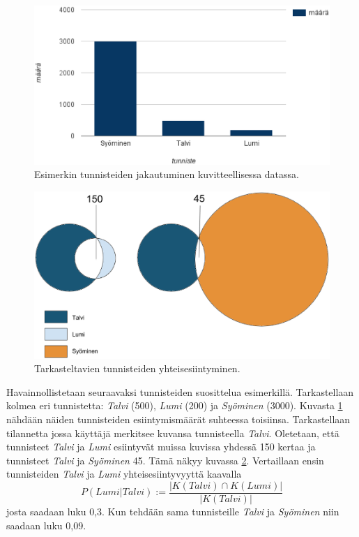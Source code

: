 \documentclass[12pt,finnish]{tktltiki2}
\theoremstyle{definition}
\theoremstyle{remark}
\begin{document}
\begin{figure}[]
\includegraphics[width = 390pt]{tunnisteet.eps}\caption{Esimerkin tunnisteiden jakautuminen kuvitteellisessa datassa.}
\label{esimerkkitunnisteet}
\end{figure}
\begin{figure}[]
\includegraphics[width = 330pt]{uudetvennit.eps}\caption{Tarkasteltavien tunnisteiden yhteisesiintyminen.}
\label{vennit}
\end{figure}
Havainnollistetaan seuraavaksi tunnisteiden suosittelua esimerkillä. Tarkastellaan kolmea eri tunnistetta: \textit{Talvi} (500), \textit{Lumi} (200) ja \textit{Syöminen} (3000). Kuvasta \ref{esimerkkitunnisteet} nähdään näiden tunnisteiden esiintymismäärät suhteessa toisiinsa. Tarkastellaan tilannetta jossa käyttäjä merkitsee kuvansa tunnisteella \textit{Talvi}. Oletetaan, että tunnisteet \textit{Talvi} ja \textit{Lumi} esiintyvät muissa kuvissa yhdessä 150 kertaa ja tunnisteet \textit{Talvi} ja \textit{Syöminen} 45. Tämä näkyy kuvassa \ref{vennit}. Vertaillaan ensin tunnisteiden \textit{Talvi} ja \textit{Lumi} yhteisesiintyvyyttä kaavalla 
\begin{displaymath} 
P (Lumi | Talvi):= \frac{|K(Talvi) \cap K(Lumi)|} {|K(Talvi)|}
\end{displaymath}
josta saadaan luku 0,3.
Kun tehdään sama tunnisteille \textit{Talvi} ja \textit{Syöminen} niin saadaan luku 0,09. 
\end{document}
